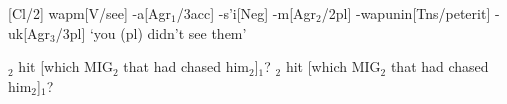 \documentclass{article}
\begin{document}
\ex
{}[Cl/2]
wapm[V/see]
-a[Agr$_1$/\sc 3acc]
-s’i[Neg]
-m[Agr$_2$/\sc 2pl]
-wapunin[Tns/peterit]
-uk[Agr$_3$/\sc 3pl]
\glft ‘you (pl) didn’t see them’
\endgl
\xe

\pex
\a{}$_2$ hit [which MIG$_2$ that had
chased him$_2$]$_1$?
\a{}$_2$ hit [which MIG$_2$ that had
chased him$_2$]$_1$?
\xe
\end{document}
